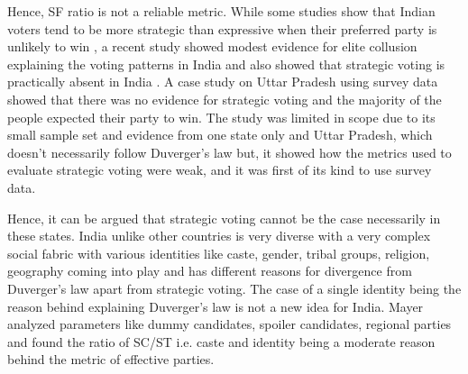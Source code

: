 \vspace{0.3cm}

Hence, SF ratio is not a reliable metric. While some studies show that Indian voters tend to be more strategic than expressive when their preferred party is unlikely to win \citep{choi2009strategic}, a recent study showed modest evidence for elite collusion explaining the voting patterns in India and also showed that strategic voting is practically absent in India \citep{ziegfeld2021accounts}. A case study on Uttar Pradesh \citep{heath2022so} using survey data showed that there was no evidence for strategic voting and the majority of the people expected their party to win. The study was limited in scope due to its small sample set and evidence from one state only and Uttar Pradesh, which doesn't necessarily follow Duverger's law but, it showed how the metrics used to evaluate strategic voting were weak, and it was first of its kind to use survey data. 

\vspace{0.3cm}

Hence, it can be argued that strategic voting cannot be the case necessarily in these states. India unlike other countries is very diverse with a very complex social fabric with various identities like caste, gender, tribal groups, religion, geography  coming into play and has different reasons for divergence from Duverger's law apart from strategic voting. The case of a single identity being the reason behind explaining Duverger’s law is not a new idea \citep{mayer2013gross} for India. Mayer analyzed parameters like dummy candidates, spoiler candidates, regional parties  and found the ratio of SC/ST i.e. caste and identity being a moderate reason behind the metric of effective parties. 




